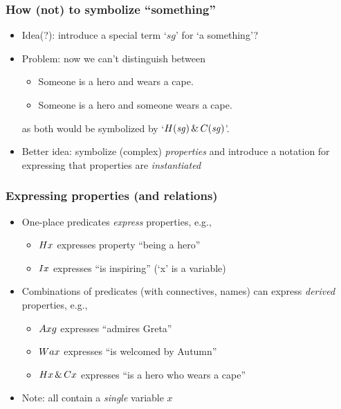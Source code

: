 \begin{frame}
  \frametitle{How (not) to symbolize ``something''}

  \begin{itemize}[<+->]
    \item Idea(?): introduce a special term `$\mathit{sg}$' for `a something'?
    \item Problem: now we can't distinguish between
    
    \medskip
    
    \begin{itemize}[<+->]
      \item Someone is a hero and wears a cape.
      \item Someone is a hero and someone wears a cape.
    \end{itemize}
       \medskip
    as both would be symbolized by `$H(\mathit{sg}) \,\&\,
    C(\mathit{sg})$'.
    \item Better idea: symbolize (complex) \emph{properties} and introduce a
    notation for expressing that properties are \emph{instantiated}
  \end{itemize}
\end{frame}

\begin{frame}
\frametitle{Expressing properties (and relations)}

  \begin{itemize}[<+->]
    \item One-place predicates \emph{express} properties, e.g.,
    \begin{itemize}[<+->]
      \item $Hx$ expresses property ``being a hero'' 
      \item $Ix$ expresses ``is inspiring'' (`x' is a variable)
    \end{itemize}
    \bigskip
    \item Combinations of predicates (with connectives, names) can
    express \emph{derived} properties, e.g.,
    \begin{itemize}[<+->]
      \item $Axg$ expresses ``admires Greta''
      \item $Wax$ expresses ``is welcomed by Autumn''
      \item $Hx \,\&\, Cx$ expresses ``is a hero who wears a cape''
    \end{itemize}
        \bigskip
    \item Note: all contain a \emph{single} variable $x$
  \end{itemize}
\end{frame}

